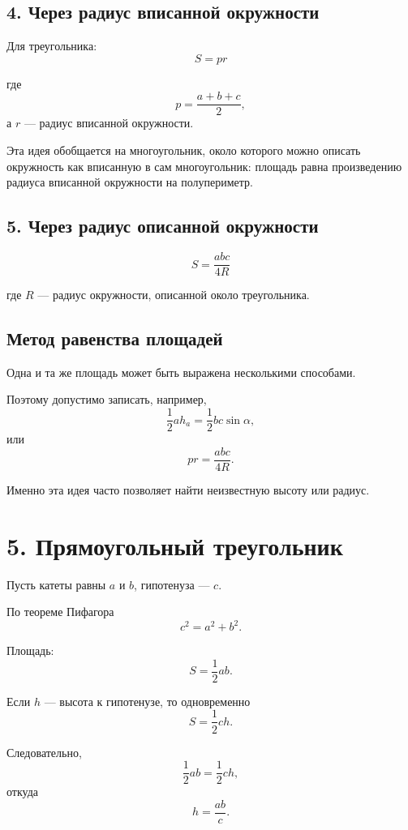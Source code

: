 \documentclass[a4paper,12pt]{article}
\begin{document}
\subsection*{4. Через радиус вписанной окружности}

Для треугольника:
\[
\boxed{S=pr}
\]

где
\[
p=\frac{a+b+c}{2},
\]
а \(r\) --- радиус вписанной окружности.

Эта идея обобщается на многоугольник, около которого можно описать окружность как вписанную в сам многоугольник: площадь равна произведению радиуса вписанной окружности на полупериметр.


\subsection*{5. Через радиус описанной окружности}

\[
\boxed{
S=\frac{abc}{4R}
}
\]

где \(R\) --- радиус окружности, описанной около треугольника.

\subsection*{Метод равенства площадей}

Одна и та же площадь может быть выражена несколькими способами.

Поэтому допустимо записать, например,
\[
\frac12 ah_a
=
\frac12 bc\sin\alpha,
\]
или
\[
pr
=
\frac{abc}{4R}.
\]

Именно эта идея часто позволяет найти неизвестную высоту или радиус.


\newpage
\section*{\textcolor{darkaccent}{5. Прямоугольный треугольник}}

Пусть катеты равны \(a\) и \(b\), гипотенуза --- \(c\).

По теореме Пифагора
\[
\boxed{c^2=a^2+b^2}.
\]

Площадь:
\[
S=\frac12 ab.
\]

Если \(h\) --- высота к гипотенузе, то одновременно
\[
S=\frac12 ch.
\]

Следовательно,
\[
\frac12 ab=\frac12 ch,
\]
откуда
\[
\boxed{
h=\frac{ab}{c}
}.
\]
\end{document}
